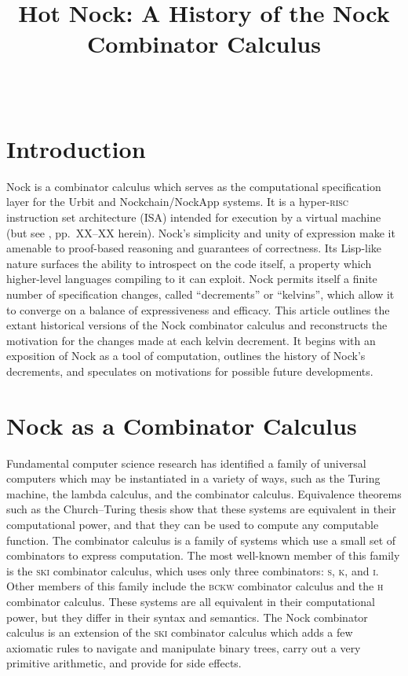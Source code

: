 \documentclass[twoside]{article}
\title{Hot Nock:  A History of the Nock Combinator Calculus}
\author{\authorname~\authorpatp \\ \affiliation}
\date{}
\begin{document}
\maketitle
\thispagestyle{firststyle}

\begin{abstract}
\end{abstract}

\setcounter{page}{1}

\tableofcontents

\section{Introduction}

Nock is a combinator calculus which serves as the computational specification layer for the Urbit and Nockchain/NockApp systems.  It is a hyper-\textsc{risc} instruction set architecture (ISA) intended for execution by a virtual machine (but see \citet{Mopfel2025}, pp.~XX–XX herein).  Nock's simplicity and unity of expression make it amenable to proof-based reasoning and guarantees of correctness.  Its Lisp-like nature surfaces the ability to introspect on the code itself, a property which higher-level languages compiling to it can exploit.  Nock permits itself a finite number of specification changes, called ``decrements'' or ``kelvins'', which allow it to converge on a balance of expressiveness and efficacy.  This article outlines the extant historical versions of the Nock combinator calculus and reconstructs the motivation for the changes made at each kelvin decrement.  It begins with an exposition of Nock as a tool of computation, outlines the history of Nock's decrements, and speculates on motivations for possible future developments.

\section{Nock as a Combinator Calculus}

Fundamental computer science research has identified a family of universal computers which may be instantiated in a variety of ways, such as the Turing machine, the lambda calculus, and the combinator calculus.  Equivalence theorems such as the Church–Turing thesis show that these systems are equivalent in their computational power, and that they can be used to compute any computable function.  The combinator calculus is a family of systems which use a small set of combinators to express computation.  The most well-known member of this family is the \textsc{ski} combinator calculus, which uses only three combinators: \textsc{s}, \textsc{k}, and \textsc{i}.  Other members of this family include the \textsc{bckw} combinator calculus and the \textsc{h} combinator calculus.  These systems are all equivalent in their computational power, but they differ in their syntax and semantics.  The Nock combinator calculus is an extension of the \textsc{ski} combinator calculus which adds a few axiomatic rules to navigate and manipulate binary trees, carry out a very primitive arithmetic, and provide for side effects.
\end{document}
